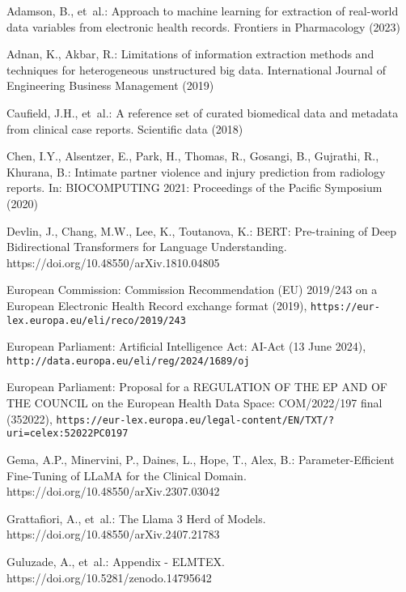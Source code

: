 \begin{thebibliography}{10}
\providecommand{\url}[1]{\texttt{#1}}
\providecommand{\urlprefix}{URL }
\providecommand{\doi}[1]{https://doi.org/#1}

Adamson, B., et~al.: Approach to machine learning for extraction of real-world data variables from electronic health records. Frontiers in Pharmacology  (2023)

Adnan, K., Akbar, R.: Limitations of information extraction methods and techniques for heterogeneous unstructured big data. International Journal of Engineering Business Management  (2019)

Caufield, J.H., et~al.: A reference set of curated biomedical data and metadata from clinical case reports. Scientific data  (2018)

Chen, I.Y., Alsentzer, E., Park, H., Thomas, R., Gosangi, B., Gujrathi, R., Khurana, B.: Intimate partner violence and injury prediction from radiology reports. In: BIOCOMPUTING 2021: Proceedings of the Pacific Symposium (2020)

Devlin, J., Chang, M.W., Lee, K., Toutanova, K.: {BERT: Pre-training of Deep Bidirectional Transformers for Language Understanding}. \doi{10.48550/arXiv.1810.04805}

{European Commission}: {Commission Recommendation (EU) 2019/243 on a European Electronic Health Record exchange format} (2019), \url{https://eur-lex.europa.eu/eli/reco/2019/243}

{European Parliament}: {Artificial Intelligence Act: AI-Act} (13 June 2024), \url{http://data.europa.eu/eli/reg/2024/1689/oj}

{European Parliament}: {Proposal for a REGULATION OF THE EP AND OF THE COUNCIL on the European Health Data Space: COM/2022/197 final} (352022), \url{https://eur-lex.europa.eu/legal-content/EN/TXT/?uri=celex:52022PC0197}

Gema, A.P., Minervini, P., Daines, L., Hope, T., Alex, B.: {Parameter-Efficient Fine-Tuning of LLaMA for the Clinical Domain}. \doi{10.48550/arXiv.2307.03042}

Grattafiori, A., et~al.: {The Llama 3 Herd of Models}. \doi{10.48550/arXiv.2407.21783}

Guluzade, A., et~al.: {Appendix - ELMTEX}. \doi{10.5281/zenodo.14795642}


\end{thebibliography}
